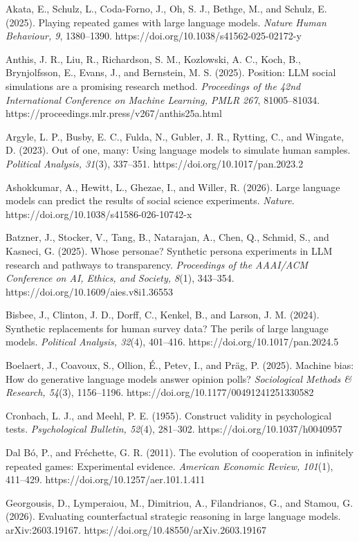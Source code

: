 \documentclass[
  11pt]{article}
\begin{document}
Akata, E., Schulz, L., Coda-Forno, J., Oh, S. J., Bethge, M., and
Schulz, E. (2025). Playing repeated games with large language models.
\emph{Nature Human Behaviour, 9}, 1380--1390.
https://doi.org/10.1038/s41562-025-02172-y

Anthis, J. R., Liu, R., Richardson, S. M., Kozlowski, A. C., Koch, B.,
Brynjolfsson, E., Evans, J., and Bernstein, M. S. (2025). Position: LLM
social simulations are a promising research method. \emph{Proceedings of
the 42nd International Conference on Machine Learning, PMLR 267},
81005--81034. https://proceedings.mlr.press/v267/anthis25a.html

Argyle, L. P., Busby, E. C., Fulda, N., Gubler, J. R., Rytting, C., and
Wingate, D. (2023). Out of one, many: Using language models to simulate
human samples. \emph{Political Analysis, 31}(3), 337--351.
https://doi.org/10.1017/pan.2023.2

Ashokkumar, A., Hewitt, L., Ghezae, I., and Willer, R. (2026). Large
language models can predict the results of social science experiments.
\emph{Nature}. https://doi.org/10.1038/s41586-026-10742-x

Batzner, J., Stocker, V., Tang, B., Natarajan, A., Chen, Q., Schmid, S.,
and Kasneci, G. (2025). Whose personae? Synthetic persona experiments in
LLM research and pathways to transparency. \emph{Proceedings of the
AAAI/ACM Conference on AI, Ethics, and Society, 8}(1), 343--354.
https://doi.org/10.1609/aies.v8i1.36553

Bisbee, J., Clinton, J. D., Dorff, C., Kenkel, B., and Larson, J. M.
(2024). Synthetic replacements for human survey data? The perils of
large language models. \emph{Political Analysis, 32}(4), 401--416.
https://doi.org/10.1017/pan.2024.5

Boelaert, J., Coavoux, S., Ollion, É., Petev, I., and Präg, P. (2025).
Machine bias: How do generative language models answer opinion polls?
\emph{Sociological Methods \& Research, 54}(3), 1156--1196.
https://doi.org/10.1177/00491241251330582

Cronbach, L. J., and Meehl, P. E. (1955). Construct validity in
psychological tests. \emph{Psychological Bulletin, 52}(4), 281--302.
https://doi.org/10.1037/h0040957

Dal Bó, P., and Fréchette, G. R. (2011). The evolution of cooperation in
infinitely repeated games: Experimental evidence. \emph{American
Economic Review, 101}(1), 411--429.
https://doi.org/10.1257/aer.101.1.411

Georgousis, D., Lymperaiou, M., Dimitriou, A., Filandrianos, G., and
Stamou, G. (2026). Evaluating counterfactual strategic reasoning in
large language models. arXiv:2603.19167.
https://doi.org/10.48550/arXiv.2603.19167
\end{document}
